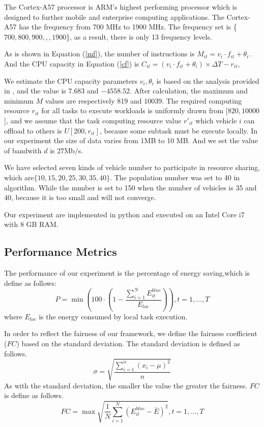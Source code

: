 \documentclass[conference]{IEEEtran}
\begin{document}
	The Cortex-A57 processor is ARM's highest performing processor which is designed to further mobile and enterprise computing applications. %
	The Cortex-A57 has the frequency from 700 MHz to 1900 MHz. The frequency set is \{$700, 800, 900,,,1900$\}, as a result, there is only 13 frequency levels. 
	
	As is shown in Equation (\ref{mf}), the number of instructions is $M_{it} = v_i \cdot f_{it} + \theta_i$. 
	And the CPU capacity in Equation (\ref{cf}) is $    	C_{it} = (v_i \cdot f_{it} + \theta_i)   \times \Delta T  - r_{it}$, 
	
	We estimate the CPU capacity parameters $v_i, \theta_i$ is based on the analysis provided in  \cite{vecman}, and the value is $7. 683$ and $−4558. 52$. 
	After calculation, the maximum and minimum $M$  values are respectively $819 $ and $ 10039$. 
	The required computing resource $r_{it}$ for all tasks to execute workloads is uniformly drawn from [$ 820, 10000  $], and we assume that the task computing resource value $r'_{it}$ which vehicle $i$ can offload to others is $ U[200, r_{it}]$, because some subtask must be execute locally. 
	In our experiment the size of data varies from 1MB to 10 MB. And we set the value of bandwith $d$ is 27Mb/s. %
	
	We have selected seven kinds of vehicle number to participate in resource sharing, which are$\{10,15, 20,25,30,35,40\}$. The population number was set to 40 in algorithm. While the number is set to 150 when the number of vehicles is 35 and 40, because it is too small and  will not converge. 
	
	Our experiment are implemented in python and executed on an Intel Core i7 with 8 GB RAM. 
	
	
	\subsection{Performance Metrics}
	The performance of our experiment is the percentage of energy saving,which is define as follows:
	\begin{equation}
		P = \min (100 \cdot 
		( 1-
		\frac{
			\sum \limits _{i=1}^{N} E^{blnc}_{it}   }{E_{loc}})), t = 1,\dots,T
	\end{equation}
	where $E_{loc}$ is the energy consumed by local task execution. 
	
	In order to reflect the fairness of our framework, we define the fairness coefficient ($FC$) based on the standard deviation. The standard deviation is defined as follows. 
	\begin{equation}
		\sigma=\sqrt{\frac{\sum_{i=1}^n\left(x_i-\mu\right)^2}{n}}
	\end{equation}
	As with the standard deviation, the smaller the value the greater the fairness. $FC$ is define as follows. 
	\begin{equation}
		FC=\max \sqrt{\frac{1}{N} \sum_{i=1}^{N}\left(E_{it}^{b l n c}-\bar{E}\right)^{2}}, t = 1,\dots,T
	\end{equation}
	
\end{document}
